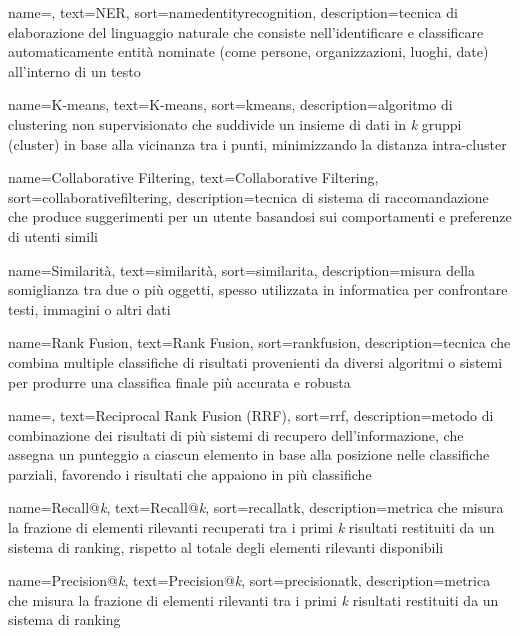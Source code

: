  {
    name=,
    text=NER,
    sort=namedentityrecognition,
    description={tecnica di elaborazione del linguaggio naturale che consiste nell'identificare e classificare automaticamente entità nominate (come persone, organizzazioni, luoghi, date) all'interno di un testo}
}

 {
    name=K-means,
    text=K-means,
    sort=kmeans,
    description={algoritmo di clustering non supervisionato che suddivide un insieme di dati in \emph{k} gruppi (cluster) in base alla vicinanza tra i punti, minimizzando la distanza intra-cluster}
}

 {
    name=Collaborative Filtering,
    text=Collaborative Filtering,
    sort=collaborativefiltering,
    description={tecnica di sistema di raccomandazione che produce suggerimenti per un utente basandosi sui comportamenti e preferenze di utenti simili}
}

 {
    name=Similarità,
    text=similarità,
    sort=similarita,
    description={misura della somiglianza tra due o più oggetti, spesso utilizzata in informatica per confrontare testi, immagini o altri dati}
}

 {
    name=Rank Fusion,
    text=Rank Fusion,
    sort=rankfusion,
    description={tecnica che combina multiple classifiche di risultati provenienti da diversi algoritmi o sistemi per produrre una classifica finale più accurata e robusta}
}

 {
    name=,
    text=Reciprocal Rank Fusion (RRF),
    sort=rrf,
    description={metodo di combinazione dei risultati di più sistemi di recupero dell'informazione, che assegna un punteggio a ciascun elemento in base alla posizione nelle classifiche parziali, favorendo i risultati che appaiono in più classifiche}
}

 {
    name=Recall@\emph{k},
    text=Recall@\emph{k},
    sort=recallatk,
    description={metrica che misura la frazione di elementi rilevanti recuperati tra i primi \emph{k} risultati restituiti da un sistema di ranking, rispetto al totale degli elementi rilevanti disponibili}
}

 {
    name=Precision@\emph{k},
    text=Precision@\emph{k},
    sort=precisionatk,
    description={metrica che misura la frazione di elementi rilevanti tra i primi \emph{k} risultati restituiti da un sistema di ranking}
}

